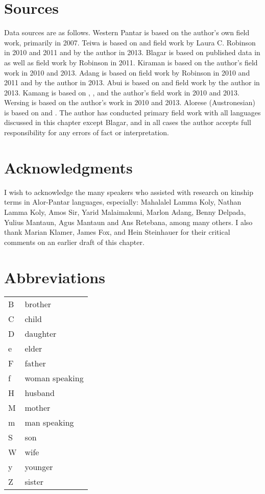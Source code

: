 \section*{Sources}
Data sources are as follows. Western Pantar is based on the author's own field work, primarily in 2007. Teiwa is based on \citet{Klamer2010grammar} and field work by Laura C. Robinson in 2010 and 2011 and by the author in 2013. Blagar is based on published data in \citet{Steinhauer1993} as well as field work by Robinson in 2011. Kiraman is based on the author's field work in 2010 and 2013. Adang is based on field work by Robinson in 2010 and 2011 and by the author in 2013. Abui is based on \citet{KratochvilEtAl2008kamus} and field work by the author in 2013. Kamang is based on \citet{Stokhof1977}, \citet{SchapperEtAl2011kamus}, and the author's field work in 2010 and 2013. Wersing is based on the author's work in 2010 and 2013. Alorese (Austronesian) is based on \citet{Needham1956} and \citet{Barnes1973}. The author has conducted primary field work with all languages discussed in this chapter except Blagar, and in all cases the author accepts full responsibility for any errors of fact or interpretation.

\section*{Acknowledgments}
I wish to acknowledge the many speakers who assisted with research on kinship terms in Alor-Pantar languages, especially: Mahalalel Lamma Koly, Nathan Lamma Koly, Amos Sir, Yarid Malaimakuni, Marlon Adang, Benny Delpada, Yulius Mantaun, Agus Mantaun and Ans Retebana, among many others. I also thank Marian Klamer, James Fox, and Hein Steinhauer for their critical comments on an earlier draft of this chapter.


\section*{Abbreviations}


\begin{tabular}{ll}
B & brother\\
C & child\\
D & daughter\\
e & elder\\
F & father\\
f & woman  speaking\\
H & husband\\
M & mother\\
m & man speaking\\
S & son\\
W & wife\\
y & younger\\
Z & sister\\
\end{tabular}

